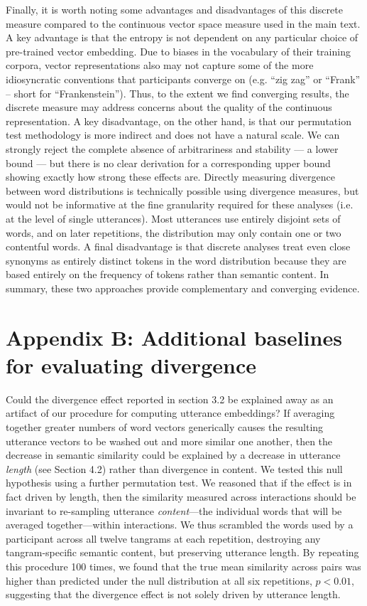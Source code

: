 \documentclass[alpha-refs]{wiley-article}
\begin{document}
Finally, it is worth noting some advantages and disadvantages of this discrete measure compared to the continuous vector space measure used in the main text.
A key advantage is that the entropy is not dependent on any particular choice of pre-trained vector embedding.
Due to biases in the vocabulary of their training corpora, vector representations also may not capture some of the more idiosyncratic conventions that participants converge on (e.g.  ``zig zag'' or ``Frank'' -- short for ``Frankenstein'').
Thus, to the extent we find converging results, the discrete measure may address concerns about the quality of the continuous representation.
A key disadvantage, on the other hand, is that our permutation test methodology is more indirect and does not have a natural scale. 
We can strongly reject the complete absence of arbitrariness and stability --- a lower bound --- but there is no clear derivation for a corresponding upper bound showing exactly how strong these effects are.
Directly measuring divergence between word distributions is technically possible using divergence measures, but would not be informative at the fine granularity required for these analyses (i.e. at the level of single utterances).
Most utterances use entirely disjoint sets of words, and on later repetitions, the distribution may only contain one or two contentful words. 
A final disadvantage is that discrete analyses treat even close synonyms as entirely distinct tokens in the word distribution because they are based entirely on the frequency of tokens rather than semantic content.
In summary, these two approaches provide complementary and converging evidence.

\section*{Appendix B: Additional baselines for evaluating divergence}

Could the divergence effect reported in section 3.2 be explained away as an artifact of our procedure for computing utterance embeddings?
If averaging together greater numbers of word vectors generically causes the resulting utterance vectors to be washed out and more similar one another, then the decrease in semantic similarity could be explained by a decrease in utterance \emph{length} (see Section 4.2) rather than divergence in content.
We tested this null hypothesis using a further  permutation test. 
We reasoned that if the effect is in fact driven by length, then the similarity measured across interactions should be invariant to re-sampling utterance \emph{content}---the individual words that will be averaged together---within interactions.
We thus scrambled the words used by a participant across all twelve tangrams at each repetition, destroying any tangram-specific semantic content, but preserving utterance length.
By repeating this procedure 100 times, we found that the true mean similarity across pairs was higher than predicted under the null distribution at all six repetitions, $p < 0.01$, suggesting that the divergence effect is not solely driven by utterance length.
\end{document}

